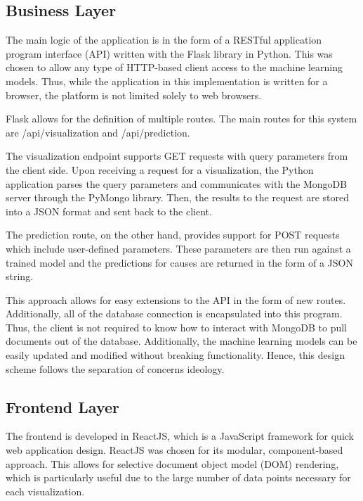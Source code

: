 \documentclass[conference]{IEEEtran}
\begin{document}
\subsection{Business Layer}
The main logic of the application is in the form of a RESTful application program interface (API) written with the Flask library in Python. This was chosen to allow any type of HTTP-based client access to the machine learning models. Thus, while the application in this implementation is written for a browser, the platform is not limited solely to web browsers. \par

Flask allows for the definition of multiple routes. The main routes for this system are /api/visualization and /api/prediction. \par

The visualization endpoint supports GET requests with query parameters from the client side. Upon receiving a request for a visualization, the Python application parses the query parameters and communicates with the MongoDB server through the PyMongo library. Then, the results to the request are stored into a JSON format and sent back to the client. \par

The prediction route, on the other hand, provides support for POST requests which include user-defined parameters. These parameters are then run against a trained model and the predictions for causes are returned in the form of a JSON string. \par

This approach allows for easy extensions to the API in the form of new routes. Additionally, all of the database connection is encapsulated into this program. Thus, the client is not required to know how to interact with MongoDB to pull documents out of the database. Additionally, the machine learning models can be easily updated and modified without breaking functionality. Hence, this design scheme follows the separation of concerns ideology. \par

\subsection{Frontend Layer}
The frontend is developed in ReactJS, which is a JavaScript framework for quick web application design. ReactJS was chosen for its modular, component-based approach. This allows for selective document object model (DOM) rendering, which is particularly useful due to the large number of data points necessary for each visualization. \par
\end{document}
